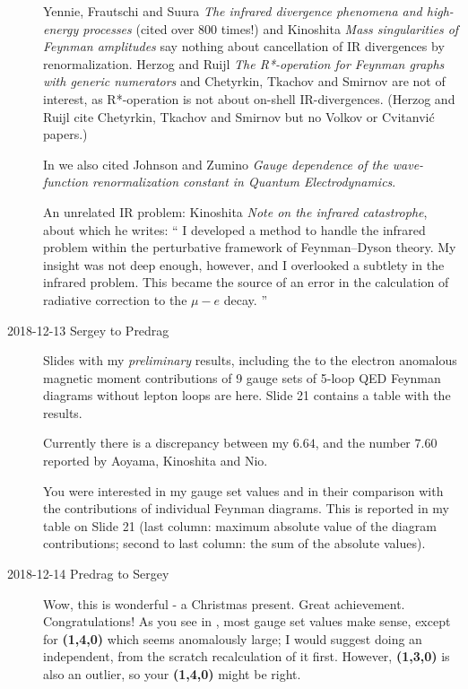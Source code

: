 \begin{description}
Yennie, Frautschi and Suura
{\em The infrared divergence phenomena and high-energy processes}
(cited over 800 times!) and
Kinoshita
{\em Mass singularities of {Feynman} amplitudes}
say nothing about cancellation of IR divergences by renormalization.
Herzog and Ruijl
{\em The {R*}-operation for {Feynman} graphs with generic numerators}
and Chetyrkin, Tkachov and
Smirnov
are not of interest, as {R*}-operation is not about on-shell IR-divergences.
(Herzog and Ruijl cite Chetyrkin, Tkachov and
Smirnov but no
Volkov or
Cvitanvi\'c papers.)

In  we also cited
Johnson and Zumino {\em Gauge dependence of the
wave-function renormalization constant in {Quantum Electrodynamics}}.

An unrelated IR problem: Kinoshita {\em Note on the infrared
catastrophe}, about which he writes: ``
I developed a method to handle the infrared problem within the
perturbative framework of Feynman–Dyson theory. My
insight was not deep enough, however, and I overlooked a subtlety in the
infrared problem. This became the source of an error in the calculation
of radiative correction to the $\mu-e$ decay.
''

\newpage
\item[2018-12-13 Sergey to Predrag]
Slides with my \emph{preliminary} results, including the  to the electron
anomalous magnetic moment contributions of 9 gauge sets of 5-loop QED
Feynman diagrams without lepton loops are
{here}. Slide 21 contains a table with the results.

Currently there is a discrepancy between my $6.64$, and the
number $7.60$ reported by Aoyama, Kinoshita and Nio.

You were interested in my gauge set values and in
their comparison with the contributions of individual Feynman
diagrams. This is reported in my table on Slide
21 (last column: maximum absolute value of the diagram contributions;
second to last column: the sum of the absolute values).

\item[2018-12-14 Predrag to Sergey]
Wow, this is wonderful - a Christmas present. Great achievement.
Congratulations! As you see in , most gauge set
values make sense, except for {\bf (1,4,0)} which seems anomalously
large; I would suggest doing an independent, from the scratch
recalculation of it first. However, {\bf (1,3,0)} is also an outlier, so
your {\bf (1,4,0)} might be right.


\end{description}
